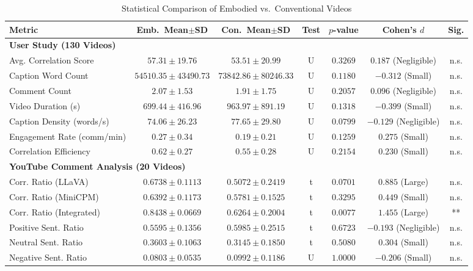 \begin{table}[H]
    \centering
    \caption{Statistical Comparison of Embodied vs.\ Conventional Videos}
    \label{tab:stat_tests}
    \scriptsize
    \begin{tabular}{l c c c c c c}
        \toprule
        \textbf{Metric} & \textbf{Emb.\ Mean$\pm$SD} & \textbf{Con.\ Mean$\pm$SD} & \textbf{Test} & \textbf{$p$-value} & \textbf{Cohen's $d$} & \textbf{Sig.} \\
        \midrule
        \multicolumn{7}{l}{\textbf{User Study (130 Videos)}} \\
        \midrule
        Avg. Correlation Score & $57.31 \pm 19.76$ & $53.51 \pm 20.99$ & U & $0.3269$ & $0.187$ (Negligible) & n.s. \\
        Caption Word Count & $54510.35 \pm 43490.73$ & $73842.86 \pm 80246.33$ & U & $0.1180$ & $-0.312$ (Small) & n.s. \\
        Comment Count & $2.07 \pm 1.53$ & $1.91 \pm 1.75$ & U & $0.2057$ & $0.096$ (Negligible) & n.s. \\
        Video Duration (s) & $699.44 \pm 416.96$ & $963.97 \pm 891.19$ & U & $0.1318$ & $-0.399$ (Small) & n.s. \\
        Caption Density (words/s) & $74.06 \pm 26.23$ & $77.65 \pm 29.80$ & U & $0.0799$ & $-0.129$ (Negligible) & n.s. \\
        Engagement Rate (comm/min) & $0.27 \pm 0.34$ & $0.19 \pm 0.21$ & U & $0.1259$ & $0.275$ (Small) & n.s. \\
        Correlation Efficiency & $0.62 \pm 0.27$ & $0.55 \pm 0.28$ & U & $0.2154$ & $0.230$ (Small) & n.s. \\
        \midrule
        \multicolumn{7}{l}{\textbf{YouTube Comment Analysis (20 Videos)}} \\
        \midrule
        Corr. Ratio (LLaVA) & $0.6738 \pm 0.1113$ & $0.5072 \pm 0.2419$ & t & $0.0701$ & $0.885$ (Large) & n.s. \\
        Corr. Ratio (MiniCPM) & $0.6392 \pm 0.1173$ & $0.5781 \pm 0.1525$ & t & $0.3295$ & $0.449$ (Small) & n.s. \\
        Corr. Ratio (Integrated) & $0.8438 \pm 0.0669$ & $0.6264 \pm 0.2004$ & t & $0.0077$ & $1.455$ (Large) & ** \\
        Positive Sent. Ratio & $0.5595 \pm 0.1356$ & $0.5985 \pm 0.2515$ & t & $0.6723$ & $-0.193$ (Negligible) & n.s. \\
        Neutral Sent. Ratio & $0.3603 \pm 0.1063$ & $0.3145 \pm 0.1850$ & t & $0.5080$ & $0.304$ (Small) & n.s. \\
        Negative Sent. Ratio & $0.0803 \pm 0.0535$ & $0.0992 \pm 0.1186$ & U & $1.0000$ & $-0.206$ (Small) & n.s. \\
        \bottomrule
    \end{tabular}
\end{table}